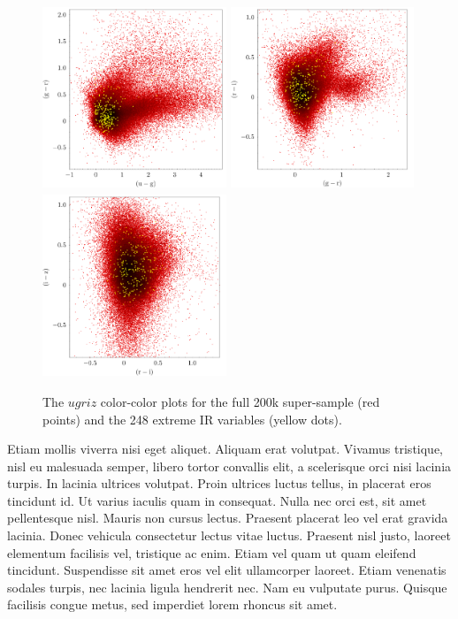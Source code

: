 \documentclass[apj]{emulateapj}
\begin{document}
    \begin{figure}
      \includegraphics[width=5.50cm, height=5.50cm, trim=0.0cm 0.0cm 0.0cm 0.0cm, clip]
      {../color_color/colorcolor_ugr_topcat.png}
      \includegraphics[width=5.50cm, height=5.50cm, trim=0.0cm 0.0cm 0.0cm 0.0cm, clip]
      {../color_color/colorcolor_gri_topcat.png}
      \includegraphics[width=5.50cm, height=5.50cm, trim=0.0cm 0.0cm 0.0cm 0.0cm, clip]
      {../color_color/colorcolor_riz_topcat.png}
      \centering
      \caption[]{The $ugriz$ color-color plots for the full 200k
        super-sample (red points) and the 248 extreme IR variables (yellow
        dots).}
      \label{fig:ugriz_colorcolor}
    \end{figure}
    Etiam mollis viverra nisi eget aliquet. Aliquam erat volutpat. Vivamus
    tristique, nisl eu malesuada semper, libero tortor convallis elit, a
    scelerisque orci nisi lacinia turpis. In lacinia ultrices
    volutpat. Proin ultrices luctus tellus, in placerat eros tincidunt
    id. Ut varius iaculis quam in consequat. Nulla nec orci est, sit amet
    pellentesque nisl. Mauris non cursus lectus. Praesent placerat leo vel
    erat gravida lacinia. Donec vehicula consectetur lectus vitae
    luctus. Praesent nisl justo, laoreet elementum facilisis vel,
    tristique ac enim. Etiam vel quam ut quam eleifend
    tincidunt. Suspendisse sit amet eros vel elit ullamcorper
    laoreet. Etiam venenatis sodales turpis, nec lacinia ligula hendrerit
    nec. Nam eu vulputate purus. Quisque facilisis congue metus, sed
    imperdiet lorem rhoncus sit amet.
    
\end{document}
